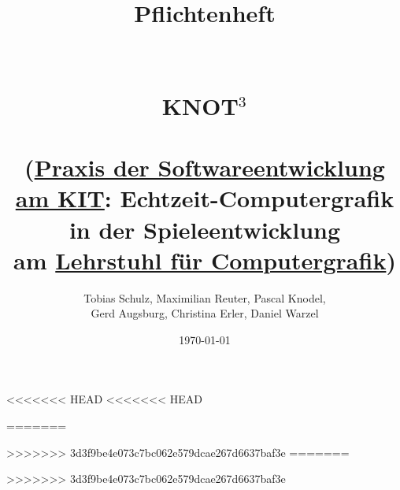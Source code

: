 \documentclass{scrreprt}
\begin{document}
	\title{	
		Pflichtenheft\\~\\~\\
		\Huge{KNOT$^3$}\\~\\
		\Large (\href{http://pp.info.uni-karlsruhe.de/lehre/WS201314/pse/}{Praxis der Softwareentwicklung am KIT}: Echtzeit-Computergrafik in der Spieleentwicklung \\am \href{http://cg.ibds.kit.edu/index.php}{Lehrstuhl für Computergrafik})
	}
	
	\author{
		Tobias Schulz, Maximilian Reuter, Pascal Knodel,\\
	 	Gerd Augsburg, Christina Erler, Daniel Warzel
	} 
	 
	\date{\today}
	
	\maketitle

	\tableofcontents
<<<<<<< HEAD
<<<<<<< HEAD

	
=======
    
>>>>>>> 3d3f9be4e073c7bc062e579dcae267d6637baf3e
=======
    
>>>>>>> 3d3f9be4e073c7bc062e579dcae267d6637baf3e
	
	
	
	
	
	
	
	
	
\end{document}
